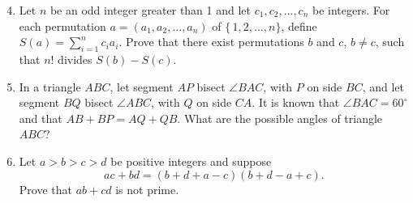 \documentclass[12pt]{article}
\def\ang{\angle}
\def\dg{^\circ}
\begin{document}
\begin{enumerate}
\setcounter{enumi}{3}
\item %
Let $n$ be an odd integer greater than 1 and let $c_1, c_2, \ldots, c_n$
be integers. For each permutation $a = (a_1, a_2, \ldots, a_n)$ of
$\{\,1,2,\ldots,n\}$, define $S(a) = \sum_{i=1}^n c_i a_i$. Prove that
there exist permutations $b$ and $c$, $b \ne c$, such that $n!$ divides
$S(b)-S(c)$.

\item %
In a triangle $ABC$, let segment $AP$ bisect $\ang BAC$, with $P$ on side
$BC$, and let segment $BQ$ bisect $\ang ABC$, with $Q$ on side $CA$. It
is known that $\ang BAC = 60\dg$ and that $AB + BP = AQ + QB$. What are
the possible angles of triangle $ABC$? 

\item %
Let $a > b > c > d$ be positive integers and suppose 
\[
ac + bd = (b+d+a-c)(b+d-a+c).
\]
Prove that $ab + cd$ is not prime.
\end{enumerate}
\end{document}
